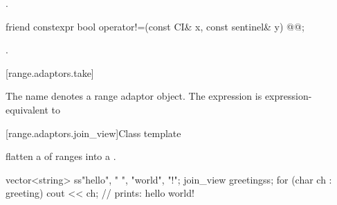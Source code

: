 \begin{itemdescr}
\pnum
\returns {}.
\end{itemdescr}

\begin{itemdecl}
friend constexpr bool operator!=(const CI& x, const sentinel& y)
  @@;
\end{itemdecl}

\begin{itemdescr}
\pnum
\returns {}.
\end{itemdescr}

[range.adaptors.take]{}

\pnum
The name  denotes a range adaptor
object.  The
expression   is expression-equivalent to 


[range.adaptors.join_view]{Class template }

\pnum
{}   flatten a
 of ranges into a
.

\pnum
\begin{example}
\begin{codeblock}
vector<string> ss{"hello", " ", "world", "!"};
join_view greeting{ss};
for (char ch : greeting)
  cout << ch; // prints: hello world!
\end{codeblock}
\end{example}

